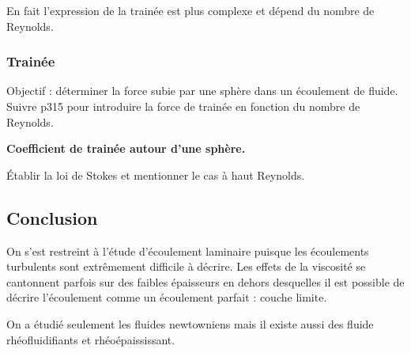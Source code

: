 \begin{transition}
En fait l'expression de la trainée est plus complexe et dépend du nombre de Reynolds.
\end{transition}

\subsubsection{Trainée}

Objectif : déterminer la force subie par une sphère dans un écoulement de fluide.
Suivre \cite{Sanz2016} p315 pour introduire la force de trainée en fonction du nombre de Reynolds.
\begin{slide}
\textbf{Coefficient de trainée autour d'une sphère.}
\end{slide}

Établir la loi de Stokes et mentionner le cas à haut Reynolds.

\subsection*{Conclusion}
On s'est restreint à l'étude d'écoulement laminaire puisque les écoulements turbulents sont extrêmement difficile à décrire.
Les effets de la viscosité se cantonnent parfois sur des faibles épaisseurs en dehors desquelles il est possible de décrire l'écoulement comme un écoulement parfait : couche limite.

On a étudié seulement les fluides newtowniens mais il existe aussi des fluide rhéofluidifiants et rhéoépaississant.

\newpage